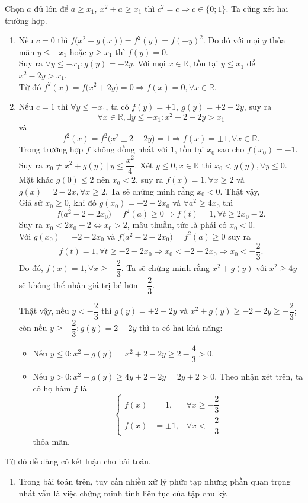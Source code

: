 \begin{bt}
{		Chọn $a$ đủ lớn để $a\geq x_1,\ x^2+a\geq x_1$ thì $c^2=c\Rightarrow c\in \{0;1\}$. Ta cũng xét hai trường hợp.
		\begin{enumerate}[\indent 1.]
			\item Nếu $c=0$ thì $f\bigl(x^2+g(x)\bigr)=f^2(y)=f(-y)^2$. Do đó với mọi $y$ thỏa mãn $y\leq -x_1$ hoặc $y\geq x_1$ thì $f(y)=0$.\\
			Suy ra $\forall y\leq -x_1\colon g(y)=-2y$. Với mọi $x\in \mathbb{R}$, tồn tại $y\leq x_1$ để $x^2-2y>x_1$.\\
			Từ đó $f^2(x)=f\bigl(x^2+2y\bigr)=0\Rightarrow f(x)=0,\forall x\in \mathbb{R}$.
			\item Nếu $c=1$ thì $\forall y\leq -x_1$, ta có $f(y)=\pm 1,\ g(y)=\pm 2-2y$, suy ra 
			$$\forall x\in \mathbb{R},\exists y\leq -x_1\colon x^2\pm 2-2y>x_1$$
			và 
			$$f^2(x)=f^2\bigl(x^2\pm 2-2y\bigr)=1\Rightarrow f(x)=\pm 1,\forall x\in \mathbb{R}.$$
			Trong trường hợp $f$ không đồng nhất với $1$, tồn tại $x_0$ sao cho $f(x_0)=-1$.\\
			Suy ra $x_0\neq x^2+g(y)\,\Big|\,y\leq \dfrac{x^2}{4}$. Xét $y\leq 0, x\in \mathbb{R}$ thì $x_0<g(y),\forall y\leq 0$.\\
			Mặt khác $g(0)\leq 2$ nên $x_0<2$, suy ra $f(x)=1,\forall x\geq 2$ và $g(x)=2-2x,\forall x\geq 2$. Ta sẽ chứng minh rằng $x_0<0$. Thật vậy,\\
			Giả sử $x_0\geq 0$, khi đó $g(x_0)=-2-2x_0$ và $\forall a^2\geq 4x_0$ thì 
			$$f\bigl(a^2-2-2x_0\bigr)=f^2(a)\geq 0\Rightarrow f(t)=1,\forall t \geq 2x_0-2.$$
			Suy ra $x_0<2x_0-2\Leftrightarrow x_0>2$, mâu thuẫn, tức là phải có $x_0<0$.\\
			Với $g(x_0)=-2-2x_0$ và $f\bigl(a^2-2-2x_0\bigr)=f^2(a)\geq 0$ suy ra
			$$f(t)=1,\forall t\geq -2-2x_0\Rightarrow x_0<-2-2x_0\Rightarrow x_0<-\dfrac{2}{3}.$$
			Do đó, $f(x)=1,\forall x\geq -\dfrac{2}{3}$. Ta sẽ chứng minh rằng $x^2+g(y)$ với $x^2\geq 4y$ sẽ không thể nhận giá trị bé hơn $-\dfrac{2}{3}$.
			
			Thật vậy, nếu $y<-\dfrac{2}{3}$ thì $g(y)=\pm 2-2y$ và $x^2+g(y)\geq -2-2y\geq -\dfrac{2}{3}$; còn nếu $y\geq -\dfrac{2}{3}\colon g(y)=2-2y$ thì ta có hai khả năng:
			\begin{itemize}
				\item Nếu $y\leq 0\colon x^2+g(y)=x^2+2-2y\geq 2-\dfrac{4}{3}>0$.
				\item Nếu $y>0\colon x^2+g(y)\geq 4y+2-2y=2y+2>0$. Theo nhận xét trên, ta có họ hàm $f$ là 
				$$\left\{\begin{aligned}
				f(x) &= 1, & \forall x\geq -\dfrac{2}{3}\\
				f(x) &= \pm 1, &\forall x<-\dfrac{2}{3}
				\end{aligned}\right.$$
				thỏa mãn.
			\end{itemize}
		\end{enumerate}
		Từ đó dễ dàng có kết luận cho bài toán.
		\begin{nx}
			\begin{enumerate}[1.]
				\item 	Trong bài toán trên, tuy cần nhiều xử lý phức tạp nhưng phần quan trọng nhất vẫn là việc chứng minh tính liên tục của tập chu kỳ.
				

\end{enumerate}
\end{nx}}
\end{bt}

